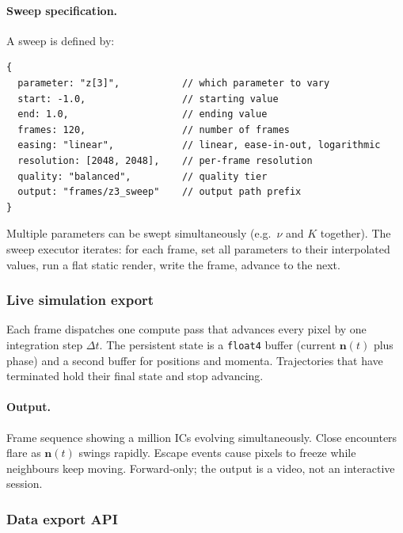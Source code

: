 \documentclass[11pt]{report}
\begin{document}
\paragraph{Sweep specification.} A sweep is defined by:
\begin{verbatim}
{
  parameter: "z[3]",           // which parameter to vary
  start: -1.0,                 // starting value
  end: 1.0,                    // ending value
  frames: 120,                 // number of frames
  easing: "linear",            // linear, ease-in-out, logarithmic
  resolution: [2048, 2048],    // per-frame resolution
  quality: "balanced",         // quality tier
  output: "frames/z3_sweep"    // output path prefix
}
\end{verbatim}

Multiple parameters can be swept simultaneously (e.g.\ $\nu$ and $K$ together). The sweep executor iterates: for each frame, set all parameters to their interpolated values, run a flat static render, write the frame, advance to the next.


\subsubsection{Live simulation export}

Each frame dispatches one compute pass that advances every pixel by one integration step $\Delta t$. The persistent state is a \texttt{float4} buffer (current $\mathbf n(t)$ plus phase) and a second buffer for positions and momenta. Trajectories that have terminated hold their final state and stop advancing.

\paragraph{Output.} Frame sequence showing a million ICs evolving simultaneously. Close encounters flare as $\mathbf n(t)$ swings rapidly. Escape events cause pixels to freeze while neighbours keep moving. Forward-only; the output is a video, not an interactive session.


\subsubsection{Data export API}
\label{sec:data_api}
\end{document}
